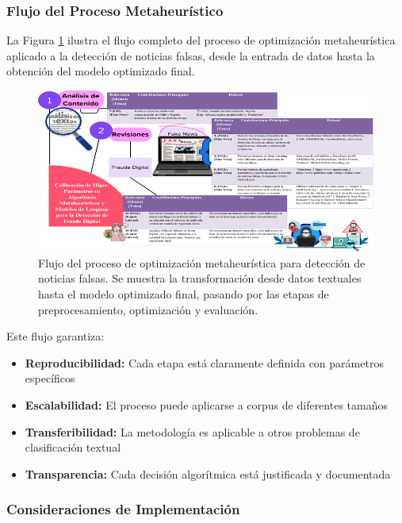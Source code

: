 \subsubsection{Flujo del Proceso Metaheurístico}

La Figura \ref{fig:flujo_metaheuristicas} ilustra el flujo completo del proceso de optimización metaheurística aplicado a la detección de noticias falsas, desde la entrada de datos hasta la obtención del modelo optimizado final.

\begin{figure}[h!]
    \centering
    \includegraphics[width=\textwidth]{Imagenes/mapaConceptual3.png}
    \caption{Flujo del proceso de optimización metaheurística para detección de noticias falsas. Se muestra la transformación desde datos textuales hasta el modelo optimizado final, pasando por las etapas de preprocesamiento, optimización y evaluación.}
    \label{fig:flujo_metaheuristicas}
\end{figure}

Este flujo garantiza:
\begin{itemize}
    \item \textbf{Reproducibilidad:} Cada etapa está claramente definida con parámetros específicos
    \item \textbf{Escalabilidad:} El proceso puede aplicarse a corpus de diferentes tamaños
    \item \textbf{Transferibilidad:} La metodología es aplicable a otros problemas de clasificación textual
    \item \textbf{Transparencia:} Cada decisión algorítmica está justificada y documentada
\end{itemize}

\subsubsection{Consideraciones de Implementación}

